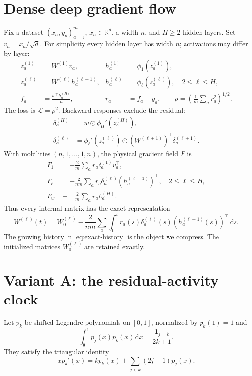 \documentclass[11pt]{article}
\theoremstyle{definition}
\theoremstyle{remark}
\newcommand{\R}{\mathbb{R}}
\newcommand{\cL}{\mathcal{L}}
\newcommand{\od}{\mathbin{\odot}}
\newcommand{\dd}{\,\mathrm{d}}
\begin{document}
\section{Dense deep gradient flow}
\label{sec:dense}

Fix a dataset $(x_a,y_a)_{a=1}^m$, $x_a\in\R^d$, a width $n$, and $H\ge2$
hidden layers.  Set $v_a=x_a/\sqrt d$.  For simplicity every hidden layer has
width $n$; activations may differ by layer:
\begin{align}
 z_a^{(1)}&=W^{(1)}v_a,& h_a^{(1)}&=\phi_1(z_a^{(1)}),\nonumber\\
 z_a^{(\ell)}&=W^{(\ell)}h_a^{(\ell-1)},&
 h_a^{(\ell)}&=\phi_\ell(z_a^{(\ell)}),\quad 2\le\ell\le H,\\
 f_a&=\frac{w^\top h_a^{(H)}}{n},& r_a&=f_a-y_a,\qquad
 \rho=\left(\frac1m\sum_a r_a^2\right)^{1/2}.\nonumber
\end{align}
The loss is $\cL=\rho^2$.  Backward responses exclude the residual:
\begin{align}
 \delta_a^{(H)}&=w\od\phi_H'(z_a^{(H)}),\nonumber\\
 \delta_a^{(\ell)}&=\phi_\ell'(z_a^{(\ell)})\od
 (W^{(\ell+1)})^\top\delta_a^{(\ell+1)}.
\end{align}
With mobilities $(n,1,\ldots,1,n)$, the physical gradient field $F$ is
\begin{align}
 F_1&=-\frac2m\sum_a r_a\delta_a^{(1)}v_a^\top,\nonumber\\
 F_\ell&=-\frac{2}{nm}\sum_a r_a\delta_a^{(\ell)}
 (h_a^{(\ell-1)})^\top,\quad 2\le\ell\le H,\label{eq:dense-flow}\\
 F_w&=-\frac2m\sum_a r_a h_a^{(H)}.\nonumber
\end{align}
Thus every internal matrix has the exact representation
\begin{equation}
 W^{(\ell)}(t)=W_0^{(\ell)}-\frac{2}{nm}\sum_a
 \int_0^t r_a(s)\delta_a^{(\ell)}(s)
 (h_a^{(\ell-1)}(s))^\top\dd s.                 \label{eq:exact-history}
\end{equation}
The growing history in \eqref{eq:exact-history} is the object we compress.
The initialized matrices $W_0^{(\ell)}$ are retained exactly.

\section{Variant A: the residual-activity clock}
\label{sec:old-clock}

Let $p_k$ be shifted Legendre polynomials on $[0,1]$, normalized by
$p_k(1)=1$ and
\[
 \int_0^1p_j(x)p_k(x)\dd x=\frac{\mathbf 1_{j=k}}{2k+1}.
\]
They satisfy the triangular identity
\begin{equation}
 x p_k'(x)=k p_k(x)+\sum_{j<k}(2j+1)p_j(x).          \label{eq:triangular}
\end{equation}
\end{document}
